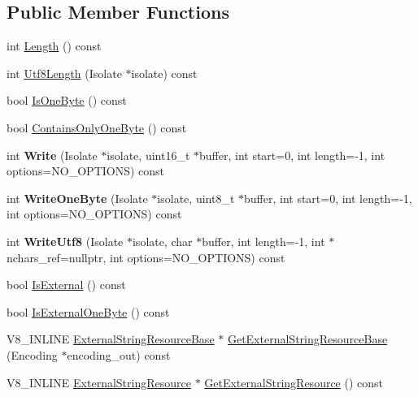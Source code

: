 \subsection*{Public Member Functions}
\begin{DoxyCompactItemize}
\item 
int \mbox{\hyperlink{classv8_1_1String_afaa18eae27056bb7058f09920a238f53}{Length}} () const
\item 
int \mbox{\hyperlink{classv8_1_1String_af99433ee51ed45337e5b4536bd28a834}{Utf8\+Length}} (Isolate $\ast$isolate) const
\item 
bool \mbox{\hyperlink{classv8_1_1String_a8f14ab3aff52295d2d3245081a1b29eb}{Is\+One\+Byte}} () const
\item 
bool \mbox{\hyperlink{classv8_1_1String_a29b9bc5f71fba74af478e806b9d6a1d6}{Contains\+Only\+One\+Byte}} () const
\item 
\mbox{\label{classv8_1_1String_a7196c4beb54cdbeaa31b84724c71a2dc}} 
int {\bfseries Write} (Isolate $\ast$isolate, uint16\+\_\+t $\ast$buffer, int start=0, int length=-\/1, int options=N\+O\+\_\+\+O\+P\+T\+I\+O\+NS) const
\item 
\mbox{\label{classv8_1_1String_a63989b39945308d79484c1a3c4c52730}} 
int {\bfseries Write\+One\+Byte} (Isolate $\ast$isolate, uint8\+\_\+t $\ast$buffer, int start=0, int length=-\/1, int options=N\+O\+\_\+\+O\+P\+T\+I\+O\+NS) const
\item 
\mbox{\label{classv8_1_1String_a7a15f155614bef1fdda4dfc1072dc846}} 
int {\bfseries Write\+Utf8} (Isolate $\ast$isolate, char $\ast$buffer, int length=-\/1, int $\ast$nchars\+\_\+ref=nullptr, int options=N\+O\+\_\+\+O\+P\+T\+I\+O\+NS) const
\item 
bool \mbox{\hyperlink{classv8_1_1String_a1d24faa97c6168221ec362c395d41ce1}{Is\+External}} () const
\item 
bool \mbox{\hyperlink{classv8_1_1String_a29b5d1786d906b84e10a5cab9451f976}{Is\+External\+One\+Byte}} () const
\item 
V8\+\_\+\+I\+N\+L\+I\+NE \mbox{\hyperlink{classv8_1_1String_1_1ExternalStringResourceBase}{External\+String\+Resource\+Base}} $\ast$ \mbox{\hyperlink{classv8_1_1String_a3031c6406f3f84bbc2d9810477a07489}{Get\+External\+String\+Resource\+Base}} (Encoding $\ast$encoding\+\_\+out) const
\item 
V8\+\_\+\+I\+N\+L\+I\+NE \mbox{\hyperlink{classv8_1_1String_1_1ExternalStringResource}{External\+String\+Resource}} $\ast$ \mbox{\hyperlink{classv8_1_1String_ac751c8c239eb213a879204cab6787883}{Get\+External\+String\+Resource}} () const

\end{DoxyCompactItemize}
